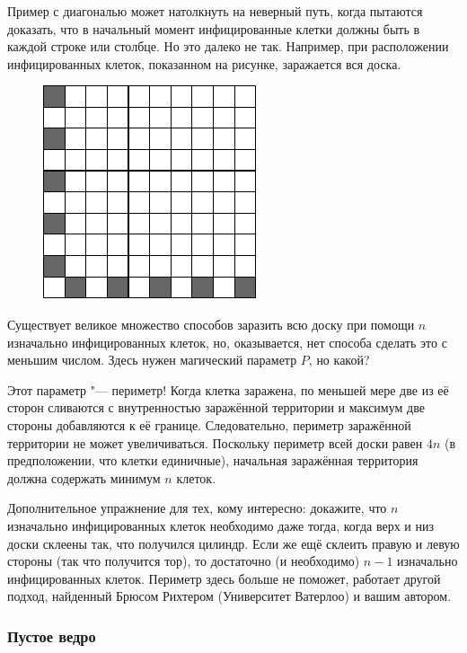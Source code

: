 \documentclass[twoside]{book}
\begin{document}
\medskip

Пример с диагональю может натолкнуть на неверный путь, когда пытаются доказать, что в начальный момент инфицированные клетки должны быть в каждой строке или столбце.
Но это далеко не так.
Например, при расположении инфицированных клеток, показанном на рисунке, заражается вся доска.


\begin{figure}[h]
\centering
\includegraphics[scale=.95]{mp/wink-170}
\end{figure}

Существует великое множество способов заразить всю доску при помощи $n$ изначально инфицированных клеток, но, оказывается, нет способа сделать это с меньшим числом.
Здесь нужен магический параметр $P$, но какой?

Этот параметр "--- периметр!
Когда клетка заражена, по меньшей мере две из её сторон сливаются с внутренностью заражённой территории и максимум две стороны добавляются к её границе.
Следовательно, периметр заражённой территории не может увеличиваться.
Поскольку периметр всей доски равен $4n$ (в предположении, что клетки единичные), начальная заражённая территория должна содержать минимум $n$ клеток.
\heart

\medskip
Дополнительное упражнение для тех, кому интересно: докажите, что $n$ изначально инфицированных клеток необходимо даже тогда, когда верх и низ доски склеены так, что получился цилиндр.
Если же ещё склеить правую и левую стороны (так что получится тор), то достаточно (и необходимо) $n-1$ изначально инфицированных клеток.
Периметр здесь больше не поможет,
работает другой подход, найденный Брюсом Рихтером (Университет Ватерлоо) %
и вашим автором.

\subsubsection*{Пустое ведро}%
\end{document}
